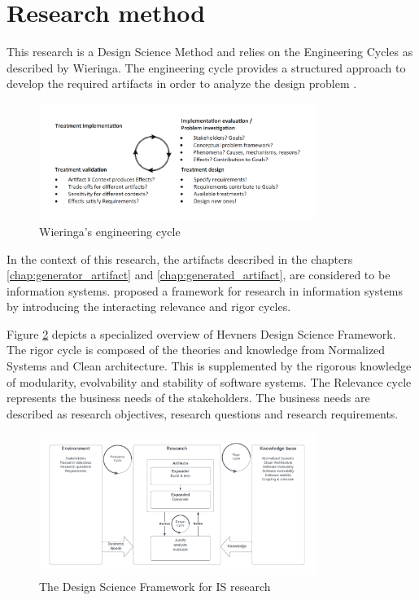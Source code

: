\section{Research method} \label{sec:research_method}

This research is a Design Science Method and relies on the Engineering Cycles as described
by Wieringa. The engineering cycle provides a structured approach to develop the
required artifacts in order to analyze the design problem \parencite{wieringa_design_2014}.

\begin{figure}[H]
    \centering
    \includegraphics[width=0.8\textwidth]{Figures/engineering_cycle.pdf}
    \caption[Engineering cycle]{Wieringa's engineering cycle}
    \label{fig:engineering_cycle}
\end{figure}

In the context of this research, the artifacts described in the chapters
\ref{chap:generator_artifact} and \ref{chap:generated_artifact}, are considered to be
information systems. \citeauthor{hevner_design_nodate} proposed a framework for research
in information systems by introducing the interacting relevance and rigor cycles.

Figure \ref{fig:dsr} depicts a specialized overview of Hevners Design Science Framework.
The rigor cycle is composed of the theories and knowledge from Normalized Systems
and Clean architecture. This is supplemented by the rigorous knowledge of modularity,
evolvability and stability of software systems. The Relevance cycle represents the
business needs of the stakeholders. The business needs are described as research
objectives, research questions and research requirements.

\begin{figure}[H]
    \centering
    \includegraphics[width=0.8\textwidth]{Figures/rigor_relevance_cycle.pdf}
    \caption[DSF]{The Design Science Framework for IS research}
    \label{fig:dsr}
\end{figure}